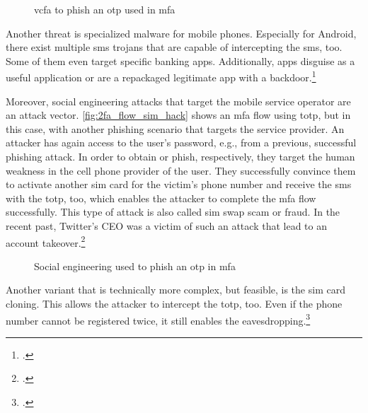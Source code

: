 \begin{figure}[hbt]
	\centering
	
	\caption[\gls{vcfa} to phish an \gls{otp} used in \gls{mfa}]{\gls{vcfa} to phish an \gls{otp} used in \gls{mfa}\footnotemark}
	\label{fig:2fa_flow_forward_phishing}
\end{figure}

Another threat is specialized malware for mobile phones. Especially for Android, there exist multiple \gls{sms} trojans that are capable of intercepting the \gls{sms}, too. Some of them even target specific banking apps. Additionally, apps disguise as a useful application or are a repackaged legitimate app with a backdoor.\footcites[See][146--149]{dmitrienko2014security}[See][152--154]{10.1007/978-3-642-39235-1_9}[See][114]{HAMED2017109}[See][]{eset-bypass2fa}

\newpage

Moreover, social engineering attacks that target the mobile service operator are an attack vector. \autoref{fig:2fa_flow_sim_hack} shows an \gls{mfa} flow using \gls{totp}, but in this case, with another phishing scenario that targets the service provider. An attacker has again access to the user's password, e.g., from a previous, successful phishing attack. In order to obtain or phish, respectively, they target the human weakness in the cell phone provider of the user. They successfully convince them to activate another \gls{sim} card for the victim's phone number and receive the \gls{sms} with the \gls{totp}, too, which enables the attacker to complete the \gls{mfa} flow successfully. This type of attack is also called \gls{sim} swap scam or fraud. In the recent past, Twitter's CEO was a victim of such an attack that lead to an account takeover.\footcites[See][19]{BLAICH201719}[See][]{twitter-hack}[See][74--76]{10.1007/978-3-642-19228-9_7}
\\
\begin{figure}[hbt]
	\centering
	
	\caption[Social engineering used to phish an \gls{otp} in \gls{mfa}]{Social engineering used to phish an \gls{otp} in \gls{mfa}\footnotemark}
	\label{fig:2fa_flow_sim_hack}
\end{figure}

Another variant that is technically more complex, but feasible, is the \gls{sim} card cloning. This allows the attacker to intercept the \gls{totp}, too. Even if the phone number cannot be registered twice, it still enables the eavesdropping.\footcites[See][873]{eckert-it-sec-9}[See][11--12]{sim-clone}

